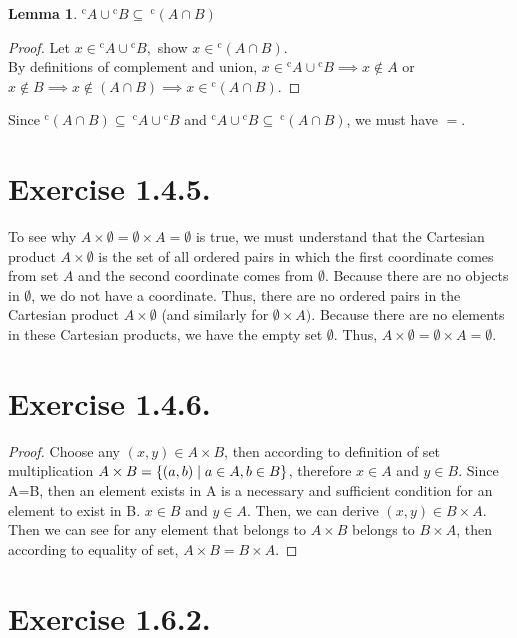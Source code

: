 \documentclass[12pt]{article}
\newtheorem{lemma}[theorem]{Lemma}
\theoremstyle{definition}
\numberwithin{equation}{subsection}
\begin{document}
\begin{lemma}
${^{\mathrm{c}}}{A} \cup {^{\mathrm{c}}}{B} \subseteq \ {^{\mathrm{c}}}(A \cap B)$
\end{lemma}
\begin{proof}
Let $x \in {^{\mathrm{c}}}{A} \cup {^{\mathrm{c}}}{B},$ show $x \in {^{\mathrm{c}}}(A \cap B).$\\
By definitions of complement and union, $x \in {^{\mathrm{c}}}{A} \cup {^{\mathrm{c}}}{B} \implies x \notin A$ or $x \notin B \implies x \notin (A \cap B) \implies x \in {^{\mathrm{c}}}(A \cap B).$
\end{proof}
Since ${^{\mathrm{c}}}(A \cap B) \subseteq \ {^{\mathrm{c}}}{A} \cup {^{\mathrm{c}}}{B} $ and ${^{\mathrm{c}}}{A} \cup {^{\mathrm{c}}}{B} \subseteq \ {^{\mathrm{c}}}(A \cap B)$, we must have $=.$

\section{Exercise 1.4.5.}
To see why $A \times \emptyset = \emptyset \times A = \emptyset$ is true, we must understand that the Cartesian product $A \times \emptyset$ is the set of all ordered pairs in which the first coordinate comes from set $A$ and the second coordinate comes from $\emptyset$. Because there are no objects in $\emptyset$, we do not have a coordinate. Thus, there are no ordered pairs in the Cartesian product $A \times \emptyset$ (and similarly for $\emptyset \times A).$ Because there are no elements in these Cartesian products, we have the empty set $\emptyset.$ Thus, $A \times \emptyset = \emptyset \times A = \emptyset.$

\section{Exercise 1.4.6.}
\begin{proof}
Choose any  $ (x,y)\in A\times B $, then according to definition of set multiplication $A \times B = \{ (a,b)\mid a \in A ,\space  b \in B \}$, therefore $x \in A$ and $y \in B$. Since A=B, then an element exists in A is a necessary and sufficient condition for an element to exist in B.  $x \in B$ and $y \in A$. Then, we can derive $ (x,y)\in B\times A $. Then we can see for any element that belongs to $A \times B$ belongs to $B \times A$, then according to equality of set, $A \times B = B \times A$.
\end{proof}

\section{Exercise 1.6.2.}
\end{document}
